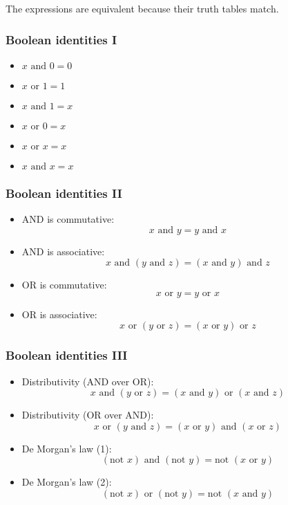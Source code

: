 \documentclass[12pt]{article}
\begin{document}
The expressions are equivalent because their truth tables match.


\subsubsection{Boolean identities I}

\begin{itemize}
    \item \( x \text{ and } 0 = 0 \)
    \item \( x \text{ or } 1 = 1 \)
    \item \( x \text{ and } 1 = x \)
    \item \( x \text{ or } 0 = x \)
    \item \( x \text{ or } x = x \)
    \item \( x \text{ and } x = x \)
\end{itemize}

\subsubsection{Boolean identities II}

\begin{itemize}
    \item AND is commutative:
    \[ x \text{ and } y = y \text{ and } x \]

    \item AND is associative:
    \[ x \text{ and } (y \text{ and } z) = (x \text{ and } y) \text{ and } z \]

    \item OR is commutative:
    \[ x \text{ or } y = y \text{ or } x \]

    \item OR is associative:
    \[ x \text{ or } (y \text{ or } z) = (x \text{ or } y) \text{ or } z \]
\end{itemize}

\subsubsection{Boolean identities III}

\begin{itemize}
    \item Distributivity (AND over OR):
    \[ x \text{ and } (y \text{ or } z) = (x \text{ and } y) \text{ or } (x \text{ and } z) \]
    
    \item Distributivity (OR over AND):
    \[ x \text{ or } (y \text{ and } z) = (x \text{ or } y) \text{ and } (x \text{ or } z) \]
    
    \item De Morgan's law (1):
    \[ (\text{not } x) \text{ and } (\text{not } y) = \text{not } (x \text{ or } y) \]

    \item De Morgan's law (2):
    \[ (\text{not } x) \text{ or } (\text{not } y) = \text{not } (x \text{ and } y) \]
\end{itemize}
\end{document}
